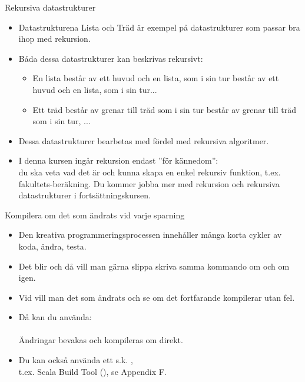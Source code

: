 \begin{Slide}{Rekursiva datastrukturer}
\begin{itemize}
\item Datastrukturena Lista och Träd är exempel på datastrukturer som passar bra ihop med rekursion.
\item Båda dessa datastrukturer kan beskrivas rekursivt:
\begin{itemize}
\item En lista består av ett huvud och en lista, som i sin tur består av ett huvud och en lista, som i sin tur...
\item Ett träd består av grenar till träd som i sin tur består av grenar till träd som i sin tur, ...
\end{itemize}
\item Dessa datastrukturer bearbetas med fördel med rekursiva algoritmer.
\item I denna kursen ingår rekursion endast ''för kännedom'': \\ du ska veta vad det är och kunna skapa en enkel rekursiv funktion, t.ex. fakultets-beräkning. Du kommer jobba mer med rekursion och rekursiva datastrukturer i fortsättningskursen.
\end{itemize}
\end{Slide}


\begin{Slide}{Kompilera om det som ändrats vid varje sparning}
\begin{itemize}
  \item Den kreativa programmeringsprocessen innehåller många korta cykler av koda, ändra, testa.
  \item Det blir  och då vill man gärna slippa skriva samma kommando om och om igen. %
  \item Vid  vill man  det som ändrats och se om det fortfarande kompilerar utan fel. 
  \item Då kan du använda:\\\\Ändringar bevakas och kompileras om direkt.
  \item  Du kan också använda ett s.k. ,\\t.ex. Scala Build Tool (), se Appendix F.

\end{itemize}
\end{Slide}

